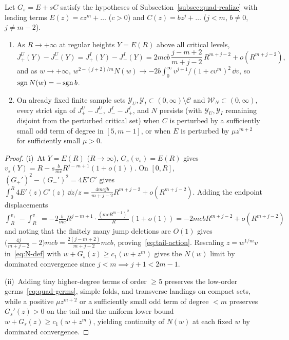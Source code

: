 \begin{lemma}\label{lem:tail-action}
Let $G_s=E+sC$ satisfy the hypotheses of Subsection~\ref{subsec:quad-realize} with leading terms $E(z)=cz^m+\dots$ ($c>0$) and $C(z)=bz^j+\dots$ ($j<m$, $b\neq 0$, $j\neq m-2$).
\begin{enumerate}
  \item[\textup{(i)}] As $R\to+\infty$ at regular heights $Y=E(R)$ above all critical levels,
  \begin{equation}\label{eq:tail-action}
    J_+^U(Y)-J_-^U(Y) = J_+^I(Y)-J_-^I(Y) = 2mcb\,\frac{j-m+2}{m+j-2}\,R^{m+j-2} + o\!\left(R^{m+j-2}\right),
  \end{equation}
  and as $w\to+\infty$, $w^{2-(j+2)/m}N(w)\to -2b\int_0^\infty v^{j+1}/(1+cv^m)^2\,\dd v$, so $\operatorname{sgn} N(w)=-\operatorname{sgn} b$.
  \item[\textup{(ii)}] On already fixed finite sample sets $\mathcal{Y}_U,\mathcal{Y}_I\subset(0,\infty)\setminus\mathcal{C}$ and $\mathcal{W}_N\subset(0,\infty)$, every strict sign of $J_+^U-J_-^U$, $J_-^I-J_+^I$, and $N$ persists (with $\mathcal{Y}_U,\mathcal{Y}_I$ remaining disjoint from the perturbed critical set) when $C$ is perturbed by a sufficiently small odd term of degree in $[5,m-1]$, or when $E$ is perturbed by $\mu z^{m+2}$ for sufficiently small $\mu>0$.
\end{enumerate}
\end{lemma}

\begin{proof}
(i)~At $Y=E(R)$ ($R\to\infty$), $G_s(v_s)=E(R)$ gives $v_s(Y)=R-s\frac{b}{mc}R^{j-m+1}(1+o(1))$. On $[0,R]$, $(G_+')^2-(G_-')^2=4E'C'$ gives $\int_0^R 4E'(z)C'(z)\,\dd z/z = \frac{4mcjb}{m+j-2}R^{m+j-2}+o(R^{m+j-2})$. Adding the endpoint displacements $\int_R^{v_+} - \int_R^{v_-} = -2\frac{b}{mc}R^{j-m+1}\cdot\frac{(mcR^{m-1})^2}{R}(1+o(1))=-2mcb R^{m+j-2}+o(R^{m+j-2})$ and noting that the finitely many jump deletions are $O(1)$ gives $\big(\frac{4j}{m+j-2}-2\big)mcb=\frac{2(j-m+2)}{m+j-2}mcb$, proving~\eqref{eq:tail-action}. Rescaling $z=w^{1/m}v$ in~\eqref{eq:N-def} with $w+G_s(z)\ge c_1(w+z^m)$ gives the $N(w)$ limit by dominated convergence since $j<m\implies j+1<2m-1$.

(ii)~Adding tiny higher-degree terms of order $\ge 5$ preserves the low-order germs~\eqref{eq:quad-germs}, simple folds, and transverse landings on compact sets, while a positive $\mu z^{m+2}$ or a sufficiently small odd term of degree $<m$ preserves $G_s'(z)>0$ on the tail and the uniform lower bound $w+G_s(z)\ge c_1(w+z^m)$, yielding continuity of $N(w)$ at each fixed $w$ by dominated convergence.
\end{proof}

